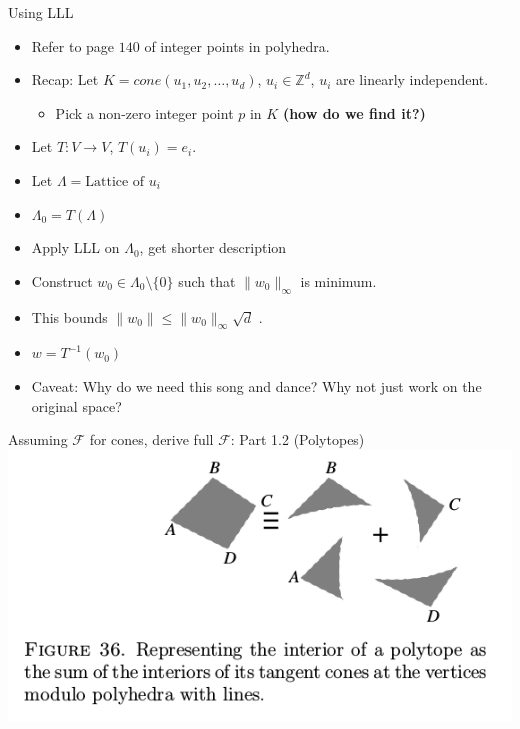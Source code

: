 \documentclass[8pt]{beamer}
\begin{document}
\begin{frame}[label=sec-22]{Using LLL}
\begin{itemize}
\item Refer to page $140$ of integer points in polyhedra.

\item Recap: Let $K = cone(u_1, u_2, \ldots, u_d)$, $u_i \in \mathbb{Z}^d$, $u_i$ are linearly independent.
\begin{itemize}
\item Pick a non-zero integer point $p$ in $K$ \textbf{(how do we find it?)}
\end{itemize}

\item Let $T: V \rightarrow V$, $T(u_i) = e_i$.
\item Let $\Lambda  = \text{Lattice of } u_i$
\item $\Lambda_0 = T(\Lambda)$
\item Apply LLL on $\Lambda_0$, get shorter description
\item Construct $w_0 \in \Lambda_0 \setminus \{ 0 \}$ such that $\lVert w_0 \rVert_{\infty}$ is minimum.
\item This bounds $\lVert w_0 \rVert  \leq \lVert w_0 \rVert_{\infty} \sqrt{d}$ .
\item $w = T^{-1}(w_0)$
\end{itemize}



\begin{itemize}
\item Caveat: Why do we need this song and dance? Why not just work on the original space?
\end{itemize}
\end{frame}

\begin{frame}[label=sec-23]{Assuming $\mathcal{F}$ for cones, derive full $\mathcal{F}$: Part 1.2 (Polytopes)}
\includegraphics[width=.9\linewidth]{./res/polytope-as-sum-of-tangent-cones.png}
\end{frame}
\end{document}
